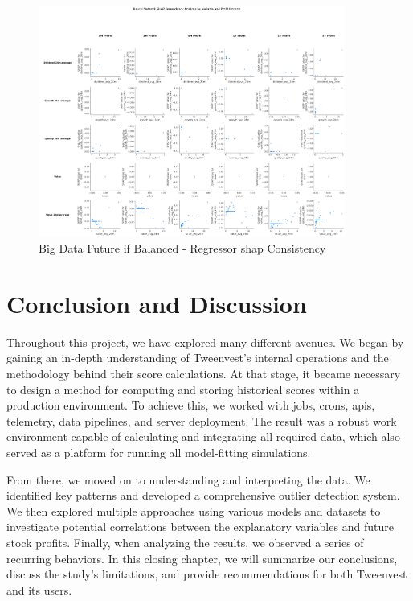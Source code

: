 \documentclass[11pt,english,a4paper,hidelinks]{book}
\begin{document}
\begin{figure}[H]
    \centering
    \includegraphics[width=0.9\textwidth]{images/code/models/neural_network/regressor_nn/Big Data future - IF HARD Balanced/shap_table_analysis.png}
    \caption{Big Data Future \acrshort{if} Balanced - Regressor \gls{shap} Consistency}
    \label{fig:regressor_big_binary_shap_consistency}
\end{figure}

\chapter{Conclusion and Discussion}

Throughout this project, we have explored many different avenues. We began by gaining an in-depth understanding of Tweenvest’s internal operations and the methodology behind their score calculations. At that stage, it became necessary to design a method for computing and storing historical scores within a production environment. To achieve this, we worked with \acrshort{job}s, \acrshort{cron}s, \acrshort{api}s, telemetry, data pipelines, and server deployment. The result was a robust work environment capable of calculating and integrating all required data, which also served as a platform for running all model-fitting simulations.

\vspace{0.5cm}
\noindent From there, we moved on to understanding and interpreting the data. We identified key patterns and developed a comprehensive outlier detection system. We then explored multiple approaches using various models and datasets to investigate potential correlations between the explanatory variables and future stock profits. Finally, when analyzing the results, we observed a series of recurring behaviors. In this closing chapter, we will summarize our conclusions, discuss the study’s limitations, and provide recommendations for both Tweenvest and its users.
\end{document}
